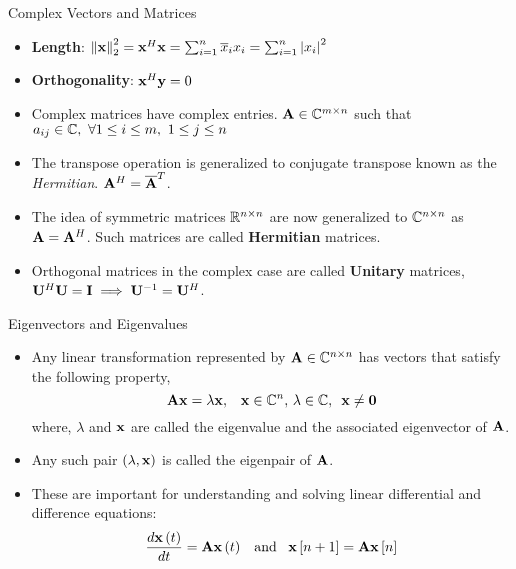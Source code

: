 \documentclass[aspectratio=169]{beamer}
\def\mf{\ensuremath\mathbf}
\def\mb{\ensuremath\mathbb}
\begin{document}
\begin{frame}[t]{Complex Vectors and Matrices}
\begin{itemize}
    \item \textbf{Length}: $\left\lVert \mf{x}\right\rVert_2^2 = \mf{x}^H\mf{x} = \sum_{i=1}^n\overline{x}_ix_i = \sum_{i=1}^n\left\lvert x_i\right\rvert^2$

    \item \textbf{Orthogonality}: $\mf{x}^H\mf{y} = 0$

    \item Complex matrices have complex entries. $\mf{A} \in \mb{C}^{m \times n}$ such that $a_{ij} \in \mb{C}, \,\, \forall 1 \leq i \leq m, \,\, 1 \leq j \leq n$

    \item The transpose operation is generalized to conjugate transpose known as the \textit{Hermitian}. $\mf{A}^H = \overline{\mf{A}}^T$.
    
    \item The idea of symmetric matrices $\mb{R}^{n \times n}$ are now generalized to $\mb{C}^{n \times n}$  as $\mf{A} = \mf{A}^H$. Such matrices are called \textbf{Hermitian} matrices.

    \item Orthogonal matrices in the complex case are called \textbf{Unitary} matrices, $\mf{U}^H\mf{U} = \mf{I} \implies \mf{U}^{-1} = \mf{U}^H$.
\end{itemize}
\end{frame}


\begin{frame}[t]{Eigenvectors and Eigenvalues}
\begin{itemize}
    \item Any linear transformation represented by $\mf{A} \in \mb{C}^{n \times n}$ has vectors that satisfy the following property,
    \[ \mf{Ax} = \lambda \mf{x}, \,\,\,\,\, \mf{x} \in \mb{C}^n, \, \lambda \in \mb{C}, \,\,\, \mf{x} \neq \mf{0} \]
    where, $\lambda$ and $\mf{x}$ are called the eigenvalue and the associated eigenvector of $\mf{A}$.
    
    \item Any such pair $\left(\lambda, \mf{x}\right)$ is called the eigenpair of $\mf{A}$.
    
    \item These are important for understanding and solving linear differential and difference equations:
    \[ \frac{d\mf{x}\left(t\right)}{dt} = \mf{A}\mf{x}\left(t\right) \,\,\, \text{ and } \,\,\, \mf{x}\left[n+1\right] = \mf{A}\mf{x}\left[n\right] \]
\end{itemize}
\end{frame}
\end{document}
